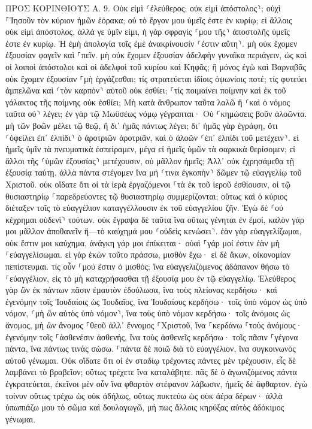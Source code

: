 \documentclass[twoside, 9pt]{extreport}
\begin{document}
ΠΡΟΣ ΚΟΡΙΝΘΙΟΥΣ Α.
9.
Οὐκ εἰμὶ ⸂ἐλεύθερος; οὐκ εἰμὶ ἀπόστολος⸃; οὐχὶ ⸀Ἰησοῦν τὸν κύριον ἡμῶν ἑόρακα; οὐ τὸ ἔργον μου ὑμεῖς ἐστε ἐν κυρίῳ; 
εἰ ἄλλοις οὐκ εἰμὶ ἀπόστολος, ἀλλά γε ὑμῖν εἰμι, ἡ γὰρ σφραγίς ⸂μου τῆς⸃ ἀποστολῆς ὑμεῖς ἐστε ἐν κυρίῳ. 
Ἡ ἐμὴ ἀπολογία τοῖς ἐμὲ ἀνακρίνουσίν ⸂ἐστιν αὕτη⸃. 
μὴ οὐκ ἔχομεν ἐξουσίαν φαγεῖν καὶ ⸀πεῖν. 
μὴ οὐκ ἔχομεν ἐξουσίαν ἀδελφὴν γυναῖκα περιάγειν, ὡς καὶ οἱ λοιποὶ ἀπόστολοι καὶ οἱ ἀδελφοὶ τοῦ κυρίου καὶ Κηφᾶς; 
ἢ μόνος ἐγὼ καὶ Βαρναβᾶς οὐκ ἔχομεν ἐξουσίαν ⸀μὴ ἐργάζεσθαι; 
τίς στρατεύεται ἰδίοις ὀψωνίοις ποτέ; τίς φυτεύει ἀμπελῶνα καὶ ⸂τὸν καρπὸν⸃ αὐτοῦ οὐκ ἐσθίει; ⸀τίς ποιμαίνει ποίμνην καὶ ἐκ τοῦ γάλακτος τῆς ποίμνης οὐκ ἐσθίει; 
Μὴ κατὰ ἄνθρωπον ταῦτα λαλῶ ἢ ⸂καὶ ὁ νόμος ταῦτα οὐ⸃ λέγει; 
ἐν γὰρ τῷ Μωϋσέως νόμῳ γέγραπται· Οὐ ⸀κημώσεις βοῦν ἀλοῶντα. μὴ τῶν βοῶν μέλει τῷ θεῷ, 
ἢ δι᾽ ἡμᾶς πάντως λέγει; δι᾽ ἡμᾶς γὰρ ἐγράφη, ὅτι ⸂ὀφείλει ἐπ᾽ ἐλπίδι⸃ ὁ ἀροτριῶν ἀροτριᾶν, καὶ ὁ ἀλοῶν ⸂ἐπ᾽ ἐλπίδι τοῦ μετέχειν⸃. 
εἰ ἡμεῖς ὑμῖν τὰ πνευματικὰ ἐσπείραμεν, μέγα εἰ ἡμεῖς ὑμῶν τὰ σαρκικὰ θερίσομεν; 
εἰ ἄλλοι τῆς ⸂ὑμῶν ἐξουσίας⸃ μετέχουσιν, οὐ μᾶλλον ἡμεῖς; Ἀλλ᾽ οὐκ ἐχρησάμεθα τῇ ἐξουσίᾳ ταύτῃ, ἀλλὰ πάντα στέγομεν ἵνα μή ⸂τινα ἐγκοπὴν⸃ δῶμεν τῷ εὐαγγελίῳ τοῦ Χριστοῦ. 
οὐκ οἴδατε ὅτι οἱ τὰ ἱερὰ ἐργαζόμενοι ⸀τὰ ἐκ τοῦ ἱεροῦ ἐσθίουσιν, οἱ τῷ θυσιαστηρίῳ ⸀παρεδρεύοντες τῷ θυσιαστηρίῳ συμμερίζονται; 
οὕτως καὶ ὁ κύριος διέταξεν τοῖς τὸ εὐαγγέλιον καταγγέλλουσιν ἐκ τοῦ εὐαγγελίου ζῆν. 
Ἐγὼ δὲ ⸂οὐ κέχρημαι οὐδενὶ⸃ τούτων. οὐκ ἔγραψα δὲ ταῦτα ἵνα οὕτως γένηται ἐν ἐμοί, καλὸν γάρ μοι μᾶλλον ἀποθανεῖν ἤ—τὸ καύχημά μου ⸂οὐδεὶς κενώσει⸃. 
ἐὰν γὰρ εὐαγγελίζωμαι, οὐκ ἔστιν μοι καύχημα, ἀνάγκη γάρ μοι ἐπίκειται· οὐαὶ ⸀γάρ μοί ἐστιν ἐὰν μὴ ⸀εὐαγγελίσωμαι. 
εἰ γὰρ ἑκὼν τοῦτο πράσσω, μισθὸν ἔχω· εἰ δὲ ἄκων, οἰκονομίαν πεπίστευμαι. 
τίς οὖν ⸀μού ἐστιν ὁ μισθός; ἵνα εὐαγγελιζόμενος ἀδάπανον θήσω τὸ ⸀εὐαγγέλιον, εἰς τὸ μὴ καταχρήσασθαι τῇ ἐξουσίᾳ μου ἐν τῷ εὐαγγελίῳ. 
Ἐλεύθερος γὰρ ὢν ἐκ πάντων πᾶσιν ἐμαυτὸν ἐδούλωσα, ἵνα τοὺς πλείονας κερδήσω· 
καὶ ἐγενόμην τοῖς Ἰουδαίοις ὡς Ἰουδαῖος, ἵνα Ἰουδαίους κερδήσω· τοῖς ὑπὸ νόμον ὡς ὑπὸ νόμον, ⸂μὴ ὢν αὐτὸς ὑπὸ νόμον⸃, ἵνα τοὺς ὑπὸ νόμον κερδήσω· 
τοῖς ἀνόμοις ὡς ἄνομος, μὴ ὢν ἄνομος ⸀θεοῦ ἀλλ᾽ ἔννομος ⸀Χριστοῦ, ἵνα ⸀κερδάνω ⸀τοὺς ἀνόμους· 
ἐγενόμην τοῖς ⸀ἀσθενέσιν ἀσθενής, ἵνα τοὺς ἀσθενεῖς κερδήσω· τοῖς πᾶσιν ⸀γέγονα πάντα, ἵνα πάντως τινὰς σώσω. 
⸀πάντα δὲ ποιῶ διὰ τὸ εὐαγγέλιον, ἵνα συγκοινωνὸς αὐτοῦ γένωμαι. 
Οὐκ οἴδατε ὅτι οἱ ἐν σταδίῳ τρέχοντες πάντες μὲν τρέχουσιν, εἷς δὲ λαμβάνει τὸ βραβεῖον; οὕτως τρέχετε ἵνα καταλάβητε. 
πᾶς δὲ ὁ ἀγωνιζόμενος πάντα ἐγκρατεύεται, ἐκεῖνοι μὲν οὖν ἵνα φθαρτὸν στέφανον λάβωσιν, ἡμεῖς δὲ ἄφθαρτον. 
ἐγὼ τοίνυν οὕτως τρέχω ὡς οὐκ ἀδήλως, οὕτως πυκτεύω ὡς οὐκ ἀέρα δέρων· 
ἀλλὰ ὑπωπιάζω μου τὸ σῶμα καὶ δουλαγωγῶ, μή πως ἄλλοις κηρύξας αὐτὸς ἀδόκιμος γένωμαι. 
\end{document}
